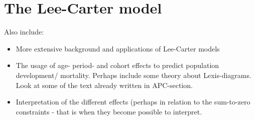 \newpage
\section{The Lee-Carter model}
\label{section:Lee-Carter}
\textcolor{myDarkGreen}{
Also include:
\begin{itemize}
    \item More extensive background and applications of Lee-Carter models
    \item The usage of age- period-  and cohort effects to predict population development/ mortality. Perhaps include some theory about Lexis-diagrams. Look at some of the text already written in APC-section. 
    \item Interpretation of the different effects (perhaps in relation to the sum-to-zero constraints - that is when they become possible to interpret.
\end{itemize}
}


